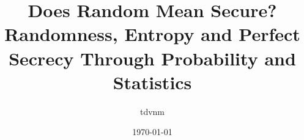 \documentclass[11pt,a4paper]{article}
\title{Does Random Mean Secure?\\
\large Randomness, Entropy and Perfect Secrecy Through Probability and Statistics}
\author{tdvnm}
\date{\today}
\begin{document}
\maketitle

\begin{abstract}
\end{abstract}

\tableofcontents
\newpage















\printbibliography
\end{document}
